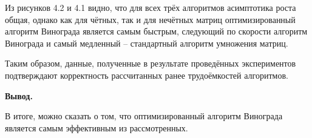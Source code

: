 \par Из рисунков 4.2 и 4.1 видно, что для всех трёх алгоритмов асимптотика роста общая, однако как для чётных, так и для нечётных матриц оптимизированный алгоритм Винограда является самым быстрым, следующий по скорости алгоритм Винограда и самый медленный -- стандартный алгоритм умножения матриц.
\par Таким образом, данные, полученные в результате проведённых экспериментов подтверждают корректность рассчитанных ранее трудоёмкостей алгоритмов.
\par\textbf{Вывод.}
\par В итоге, можно сказать о том, что оптимизированный алгоритм Винограда является самым эффективным из рассмотренных.
